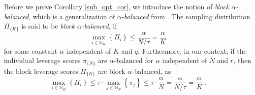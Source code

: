 \documentclass[journal,letterpaper,onecolumn,twoside,nofonttune]{IEEEtran}
\newcommand{\N}{\mathbb{N}}
\begin{document}
Before we prove Corollary \ref{sub_opt_cor}, we introduce the notion of \textit{block $\alpha$-balanced}, which is a generalization of \textit{$\alpha$-balanced} from \cite{PW16}. The sampling distribution $\Pi_{\{K\}}$ is said to be \textit{block $\alpha$-balanced}, if
\begin{equation}
\label{bl_alpha_bal}
  \max_{i\in\N_K}\left\{\Pi_i\right\} \leqslant \frac{\alpha}{N/\tau}=\dfrac{\alpha}{K}
\end{equation}
for some constant $\alpha$ independent of $K$ and $q$. Furthermore, in our context, if the individual leverage scores $\pi_{\{N\}}$ are $\alpha$-balanced for $\alpha$ independent of $N$ and $r$, then the block leverage scores $\Pi_{\{K\}}$ are block $\alpha$-balanced, as
\begin{equation}
\label{impl_bal_wts}  %
  \max_{i\in\N_K}\left\{\Pi_i\right\} \leqslant \tau\cdot\max_{j\in\N_N}\left\{\pi_j\right\} \leqslant \tau\cdot\frac{\alpha}{N} = \frac{\alpha}{N/\tau} = \frac{\alpha}{K}\ .
\end{equation}
\end{document}
